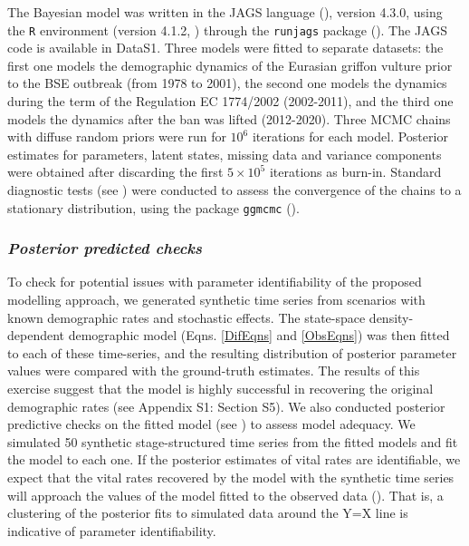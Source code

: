 \documentclass[12pt]{article}
\begin{document}
The Bayesian model was written in the JAGS language (\cite{Plummer2003}), version 4.3.0, using the \verb|R| environment (version 4.1.2, \cite{R2021}) through the \verb|runjags| package (\cite{Denwood2016}). The JAGS code is available in DataS1. Three models were fitted to separate datasets: the first one models the demographic dynamics of the Eurasian griffon vulture prior to the BSE outbreak (from 1978 to 2001), the second one models the dynamics during the term of the Regulation EC 1774/2002 (2002-2011), and the third one models the dynamics after the ban was lifted (2012-2020). Three MCMC chains with diffuse random priors were run for $10^6$ iterations for each model. Posterior estimates for parameters, latent states, missing data and variance components were obtained after discarding the first $5 \times 10^5$ iterations as burn-in. Standard diagnostic tests (see \cite{Gelman2014}) were conducted to assess the convergence of the chains to a stationary distribution, using the package \verb|ggmcmc| (\cite{Fernandez-Marin2016}).\\

\subsubsection*{\textit{Posterior predicted checks}}

To check for potential issues with parameter identifiability of the proposed modelling approach, we generated synthetic time series from scenarios with known demographic rates and stochastic effects. The state-space density-dependent demographic model (Eqns. \ref{DifEqns} and \ref{ObsEqns}) was then fitted to each of these time-series, and the resulting distribution of posterior parameter values were compared with the ground-truth estimates. The results of this exercise suggest that the model is highly successful in recovering the original demographic rates (see Appendix S1: Section S5). We also conducted posterior predictive checks on the fitted model (see \cite{Gelman2014}) to assess model adequacy. We simulated 50 synthetic stage-structured time series from the fitted models and fit the model to each one. If the posterior estimates of vital rates are identifiable, we expect that the vital rates recovered by the model with the synthetic time series will approach the values of the model fitted to the observed data (\cite{Gelman2014}). That is, a clustering of the posterior fits to simulated data around the Y=X line is indicative of parameter identifiability.
\end{document}
